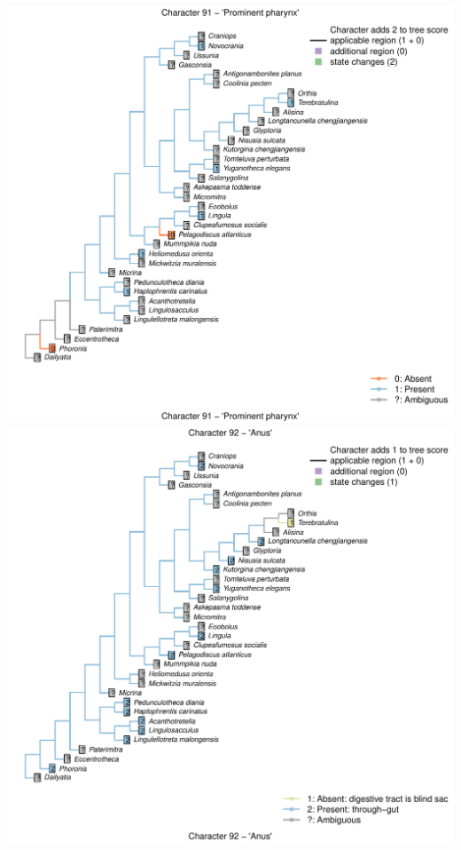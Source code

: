 \documentclass[]{book}
\theoremstyle{definition}
\theoremstyle{definition}
\theoremstyle{definition}
\theoremstyle{remark}
\begin{document}
\includegraphics{Brachiopod_phylogeny_files/figure-latex/unnamed-chunk-4-91.pdf}
\includegraphics{Brachiopod_phylogeny_files/figure-latex/unnamed-chunk-4-92.pdf}
\end{document}
